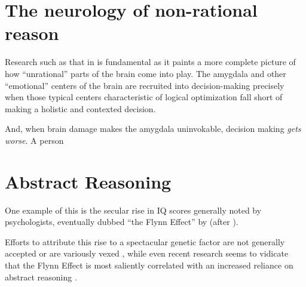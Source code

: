 \documentclass{article}
\begin{document}
\section{The neurology of non-rational reason}

Research such as that in \textcite{hsu05} is fundamental as it paints a more complete picture of how ``unrational'' parts of the brain come into play.
The amygdala and other ``emotional'' centers of the brain are recruited into decision-making precisely when those typical centers characteristic of logical optimization fall short of making a holistic and contexted decision.

And, when brain damage makes the amygdala uninvokable, decision making \emph{gets worse}.
A person

\section{Abstract Reasoning}

One example of this is the secular rise in IQ scores generally noted by psychologists, eventually dubbed ``the Flynn Effect'' by \textcite{herrnstein94} (after \textcite{flynn87}).

Efforts to attribute this rise to a spectacular genetic factor are not generally accepted or are variously vexed \parencite{woodley11}, while even recent research seems to vidicate that the Flynn Effect is most saliently correlated with an increased reliance on abstract reasoning \parencite{must16}.

\printbibliography
\end{document}
